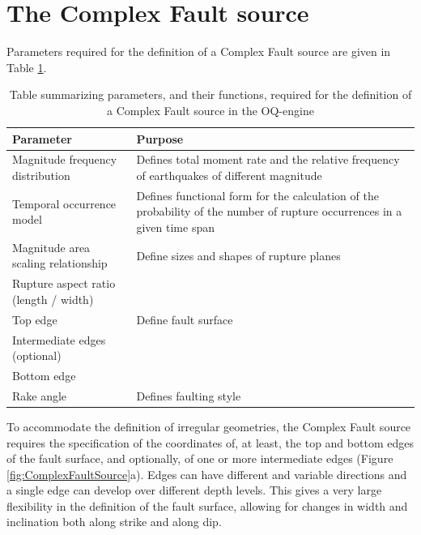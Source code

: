\section{The Complex Fault source}
Parameters required for the definition of a Complex Fault source are given in
Table \ref{table:complex_fault_tab}.
\begin{table}
\centering
\caption{Table summarizing parameters, and their functions, required for the
definition of a Complex Fault source in the OQ-engine}
\begin{tabular}{|p{60mm} p{60mm}|}
\hline
\rowcolor{anti-flashwhite}
\bf{Parameter} & \bf{Purpose} \\ \hline
Magnitude frequency distribution & Defines total moment rate and the relative
frequency of earthquakes of different magnitude\\
\hline
Temporal occurrence model & Defines functional form for the calculation of
the probability of the number of rupture occurrences in a given time span\\ 
\hline
Magnitude area scaling relationship & Define sizes and shapes of rupture planes
\\ 
Rupture aspect ratio (length / width) & \\
\hline
Top edge & Define fault surface \\
Intermediate edges (optional) & \\
Bottom edge & \\
\hline
Rake angle & Defines faulting style \\
\hline %
\end{tabular}
\label{table:complex_fault_tab}
\end{table}
To accommodate the definition of irregular geometries, the Complex Fault source
requires the specification of the coordinates of, at least, the top and bottom
edges of the fault surface, and optionally, of one or more intermediate edges
(Figure \ref{fig:ComplexFaultSource}a). Edges can have different and variable
directions and a single edge can develop over different depth levels.  This
gives a very large flexibility in the definition of the fault surface, allowing
for changes in width and inclination both along strike and along dip.

